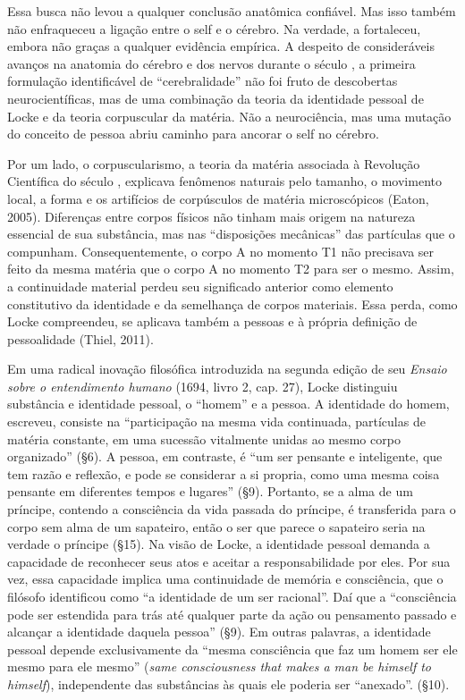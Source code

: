 Essa busca não levou a qualquer conclusão anatômica confiável. Mas isso
também não enfraqueceu a ligação entre o self e o cérebro. Na verdade, a
fortaleceu, embora não graças a qualquer evidência empírica. A despeito
de consideráveis avanços na anatomia do cérebro e dos nervos durante o
século , a primeira formulação identificável de ``cerebralidade''
não foi fruto de descobertas neurocientíficas, mas de uma combinação da
teoria da identidade pessoal de Locke e da teoria corpuscular da
matéria. Não a neurociência, mas uma mutação do conceito de pessoa abriu
caminho para ancorar o self no cérebro.

Por um lado, o corpuscularismo, a teoria da matéria associada à
Revolução Científica do século , explicava fenômenos naturais pelo
tamanho, o movimento local, a forma e os artifícios de corpúsculos de
matéria microscópicos (Eaton, 2005). Diferenças entre corpos físicos não
tinham mais origem na natureza essencial de sua substância, mas nas
``disposições mecânicas'' das partículas que o compunham.
Consequentemente, o corpo A no momento T1 não precisava ser feito da
mesma matéria que o corpo A no momento T2 para ser o mesmo. Assim, a
continuidade material perdeu seu significado anterior como elemento
constitutivo da identidade e da semelhança de corpos materiais. Essa
perda, como Locke compreendeu, se aplicava também a pessoas e à própria
definição de pessoalidade (Thiel, 2011).

Em uma radical inovação filosófica introduzida na segunda edição de seu
\emph{Ensaio sobre o entendimento humano} (1694, livro 2, cap. 27),
Locke distinguiu substância e identidade pessoal, o ``homem'' e a
pessoa. A identidade do homem, escreveu, consiste na ``participação na
mesma vida continuada, partículas de matéria constante, em uma sucessão
vitalmente unidas ao mesmo corpo organizado'' (§6). A pessoa, em
contraste, é ``um ser pensante e inteligente, que tem razão e reflexão,
e pode se considerar a si propria, como uma mesma coisa pensante em
diferentes tempos e lugares'' (§9). Portanto, se a alma de um príncipe,
contendo a consciência da vida passada do príncipe, é transferida para o
corpo sem alma de um sapateiro, então o ser que parece o sapateiro seria
na verdade o príncipe (§15). Na visão de Locke, a identidade pessoal
demanda a capacidade de reconhecer seus atos e aceitar a
responsabilidade por eles. Por sua vez, essa capacidade implica uma
continuidade de memória e consciência, que o filósofo identificou como
``a identidade de um ser racional''. Daí que a ``consciência pode ser
estendida para trás até qualquer parte da ação ou pensamento passado e
alcançar a identidade daquela pessoa'' (§9). Em outras palavras, a
identidade pessoal depende exclusivamente da ``mesma consciência que faz
um homem ser ele mesmo para ele mesmo'' (\emph{same consciousness that
makes a man be himself to himself}), independente das substâncias às
quais ele poderia ser ``anexado''. (§10).

